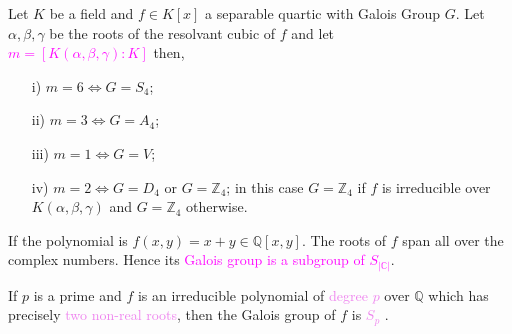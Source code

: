 \begin{frame}
  \begin{tcolorbox}[colback=white, colframe=blue!40, boxsep=0mm]
\begin{theorem}[Theorem]
  Let \(K\) be a field and \(f \in K[x]\) a separable quartic with Galois Group \(G\). Let \(\alpha, \beta, \gamma\) be the roots of the resolvant cubic of \(f\) and let\\
  \textcolor{magenta}{\(m= [K(\alpha, \beta, \gamma) : K]\)} then,
\begin{enumerate}
\item[i)] \(m=6 \Longleftrightarrow G=S_4\);
\item[ii)] \(m=3 \Longleftrightarrow G=A_4\);
\item[iii)] \(m=1 \Longleftrightarrow G=V\);
\item[iv)] \(m=2 \Longleftrightarrow G=D_4\) or \(G={\mathbb{Z}}_4\); in this case \(G={\mathbb{Z}}_4\) if \(f\) is irreducible over \(K(\alpha, \beta, \gamma)\) and \(G={\mathbb{Z}}_4\) otherwise\cite{hunger}.
\end{enumerate}
\end{theorem}
\end{tcolorbox}
\vspace{2mm}



If the polynomial is \textcolor{green!50!black}{\(f(x,y)=x+y \in \mathbb{Q}[x,y]\)}. The roots of \(f\) span all over the complex numbers. Hence its \textcolor{magenta}{Galois group is a subgroup of  \(S_{|\mathbb{C}|}\)}.



\begin{theorem}[Theorem]
If \(p\) is a prime and \(f\) is an irreducible polynomial of \textcolor{violet}{degree \(p\)} over \(\mathbb{Q}\) which has precisely \textcolor{violet}{two non-real roots}, then the Galois group of \(f\) is \textcolor{violet}{\(S_p\)} \cite{hunger}.
\end{theorem}
\end{frame}

